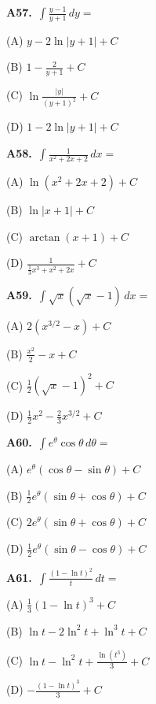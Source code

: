 \documentclass[11pt]{article}
\begin{document}
\bigskip\noindent\textbf{A57.}\ $\displaystyle\int \frac{y-1}{y+1}\,dy=$
\begin{list}{}{\setlength{\leftmargin}{3em}\setlength{\labelwidth}{2.5em}\setlength{\itemsep}{0pt}\setlength{\topsep}{2pt}}
\item[(A)] $y-2\ln\lvert y+1\rvert+C$
\item[(B)] $1-\frac2{y+1}+C$
\item[(C)] $\ln\frac{\lvert y\rvert}{(y+1)^2}+C$
\item[(D)] $1-2\ln\lvert y+1\rvert+C$
\end{list}

\bigskip\noindent\textbf{A58.}\ $\displaystyle\int \frac1{x^2+2x+2}\,dx=$
\begin{list}{}{\setlength{\leftmargin}{3em}\setlength{\labelwidth}{2.5em}\setlength{\itemsep}{0pt}\setlength{\topsep}{2pt}}
\item[(A)] $\ln(x^2+2x+2)+C$
\item[(B)] $\ln\lvert x+1\rvert+C$
\item[(C)] $\arctan(x+1)+C$
\item[(D)] $\frac1{\frac13x^3+x^2+2x}+C$
\end{list}

\bigskip\noindent\textbf{A59.}\ $\displaystyle\int \sqrt x(\sqrt x-1)\,dx=$
\begin{list}{}{\setlength{\leftmargin}{3em}\setlength{\labelwidth}{2.5em}\setlength{\itemsep}{0pt}\setlength{\topsep}{2pt}}
\item[(A)] $2(x^{3/2}-x)+C$
\item[(B)] $\frac{x^2}2-x+C$
\item[(C)] $\frac12(\sqrt x-1)^2+C$
\item[(D)] $\frac12x^2-\frac23x^{3/2}+C$
\end{list}

\bigskip\noindent\textbf{A60.}\ $\displaystyle\int e^\theta\cos\theta\,d\theta=$
\begin{list}{}{\setlength{\leftmargin}{3em}\setlength{\labelwidth}{2.5em}\setlength{\itemsep}{0pt}\setlength{\topsep}{2pt}}
\item[(A)] $e^\theta(\cos\theta-\sin\theta)+C$
\item[(B)] $\frac12e^\theta(\sin\theta+\cos\theta)+C$
\item[(C)] $2e^\theta(\sin\theta+\cos\theta)+C$
\item[(D)] $\frac12e^\theta(\sin\theta-\cos\theta)+C$
\end{list}

\bigskip\noindent\textbf{A61.}\ $\displaystyle\int \frac{(1-\ln t)^2}t\,dt=$
\begin{list}{}{\setlength{\leftmargin}{3em}\setlength{\labelwidth}{2.5em}\setlength{\itemsep}{0pt}\setlength{\topsep}{2pt}}
\item[(A)] $\frac13(1-\ln t)^3+C$
\item[(B)] $\ln t-2\ln^2t+\ln^3t+C$
\item[(C)] $\ln t-\ln^2t+\frac{\ln(t^3)}3+C$
\item[(D)] $-\frac{(1-\ln t)^3}3+C$
\end{list}
\end{document}
